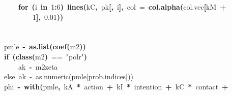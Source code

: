 \documentclass{article}
\makeatletter
\newcommand{\hlnumber}[1]{\textcolor[rgb]{0,0,0}{#1}}%
\newcommand{\hlfunctioncall}[1]{\textcolor[rgb]{.5,0,.33}{\textbf{#1}}}%
\newcommand{\hlstring}[1]{\textcolor[rgb]{.6,.6,1}{#1}}%
\newcommand{\hlkeyword}[1]{\textbf{#1}}%
\newcommand{\hlargument}[1]{\textcolor[rgb]{.69,.25,.02}{#1}}%
\newcommand{\hlcomment}[1]{\textcolor[rgb]{.18,.6,.34}{#1}}%
\newcommand{\hlassignement}[1]{\textbf{#1}}%
\newcommand{\hlsymbol}[1]{#1}%
\newcommand{\hlstd}[1]{\textcolor[rgb]{0,0,0}{#1}}%
\newenvironment{kframe}{%
 \def\FrameCommand##1{\hskip\@totalleftmargin \hskip-\fboxsep
 \colorbox{shadecolor}{##1}\hskip-\fboxsep
     \hskip-\linewidth \hskip-\@totalleftmargin \hskip\columnwidth}%
 \MakeFramed {\advance\hsize-\width
   \@totalleftmargin\z@ \linewidth\hsize
   \@setminipage}}%
 {\par\unskip\endMakeFramed}
\newenvironment{knitrout}{}{} %
\makeatother
\begin{document}
\begin{knitrout}
{\begin{kframe}
\begin{flushleft}
\hlstd{}{\ }{\ }{\ }{\ }{\ }{\ }{\ }{\ }{\ }{\ }{\ }{\ }\hlkeyword{for}{\ }\hlkeyword{(}\hlsymbol{i}{\ }\hlkeyword{in}{\ }\hlnumber{1}\hlkeyword{:}\hlnumber{6}\hlkeyword{)}{\ }\hlfunctioncall{lines}\hlkeyword{(}\hlsymbol{kC}\hlkeyword{,}{\ }\hlsymbol{pk}\hlkeyword{[}\hlkeyword{,}{\ }\hlsymbol{i}\hlkeyword{]}\hlkeyword{,}{\ }\hlargument{col}{\ }\hlargument{=}{\ }\hlfunctioncall{col.alpha}\hlkeyword{(}\hlsymbol{col.vec}\hlkeyword{[}\hlsymbol{kM}{\ }\hlkeyword{+}\hspace*{\fill}\\
\hlstd{}{\ }{\ }{\ }{\ }{\ }{\ }{\ }{\ }{\ }{\ }{\ }{\ }{\ }{\ }{\ }{\ }\hlnumber{1}\hlkeyword{]}\hlkeyword{,}{\ }\hlnumber{0.01}\hlkeyword{)}\hlkeyword{)}\hspace*{\fill}\\
\hlstd{}{\ }{\ }{\ }{\ }{\ }{\ }{\ }{\ }\hlkeyword{\usebox{\hlnormalsizeboxclosebrace}}\hspace*{\fill}\\
\hlstd{}\hspace*{\fill}\\
\hlstd{}{\ }{\ }{\ }{\ }{\ }{\ }{\ }{\ }\hlsymbol{pmle}{\ }\hlassignement{\usebox{\hlnormalsizeboxlessthan}-}{\ }\hlfunctioncall{as.list}\hlkeyword{(}\hlfunctioncall{coef}\hlkeyword{(}\hlsymbol{m2}\hlkeyword{)}\hlkeyword{)}\hspace*{\fill}\\
\hlstd{}{\ }{\ }{\ }{\ }{\ }{\ }{\ }{\ }\hlkeyword{if}{\ }\hlkeyword{(}\hlfunctioncall{class}\hlkeyword{(}\hlsymbol{m2}\hlkeyword{)}{\ }=={\ }\hlstring{"{}polr"{}}\hlkeyword{)}\hspace*{\fill}\\
\hlstd{}{\ }{\ }{\ }{\ }{\ }{\ }{\ }{\ }{\ }{\ }{\ }{\ }\hlsymbol{ak}{\ }\hlassignement{\usebox{\hlnormalsizeboxlessthan}-}{\ }\hlsymbol{m2}\hlkeyword{\usebox{\hlnormalsizeboxdollar}}\hlsymbol{zeta}\hspace*{\fill}\\
\hlstd{}{\ }{\ }{\ }{\ }{\ }{\ }{\ }{\ }\hlcomment{\usebox{\hlnormalsizeboxhash}else{\ }ak{\ }\usebox{\hlnormalsizeboxlessthan}-{\ }as.numeric(pmle[prob.indices]))}\hspace*{\fill}\\
\hlstd{}{\ }{\ }{\ }{\ }{\ }{\ }{\ }{\ }\hlsymbol{phi}\hlsymbol{}{\ }\hlassignement{\usebox{\hlnormalsizeboxlessthan}-}{\ }\hlfunctioncall{with}\hlkeyword{(}\hlsymbol{pmle}\hlkeyword{,}{\ }\hlsymbol{kA}{\ }\hlkeyword{*}{\ }\hlsymbol{action}{\ }\hlkeyword{+}{\ }\hlsymbol{kI}{\ }\hlkeyword{*}{\ }\hlsymbol{intention}{\ }\hlkeyword{+}{\ }\hlsymbol{kC}{\ }\hlkeyword{*}{\ }\hlsymbol{contact}{\ }\hlkeyword{+}\hspace*{\fill}\\

\end{flushleft}
\end{kframe}}
\end{knitrout}
\end{document}
